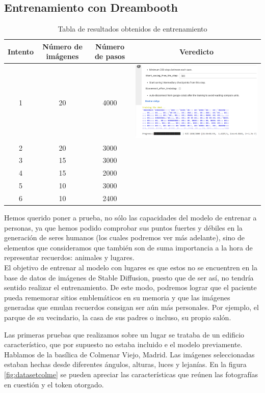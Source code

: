 \subsection{Entrenamiento con Dreambooth}
\begin{table}
	\centering
	\begin{tabular}{c|c|c|c}
		\textbf{Intento} & \textbf{Número de imágenes} & \textbf{Número de pasos} & \textbf{Veredicto} \\
		\hline\hline
		1 & 20 & 4000 & \includegraphics[width = 0.3
			\textwidth]{Imagenes/Vectorial/dreambooth.png}\\
		2 & 20 & 3000 & \\
		3 & 15 & 3000 & \\
		4 & 15 & 2000 & \\
		5 & 10 & 3000 & \\
		6 & 10 & 2400 & \\
		\hline
	\end{tabular}
	\caption{Tabla de resultados obtenidos de entrenamiento}
	\label{tab:resultadosentrenamiento}
\end{table}


Hemos querido poner a prueba, no sólo las capacidades del modelo de entrenar a personas, ya que hemos podido comprobar sus puntos fuertes y débiles en la generación de seres humanos (los cuales podremos ver más adelante), sino de elementos que consideramos que también son de suma importancia a la hora de representar recuerdos: animales y lugares. \\

El objetivo de entrenar al modelo con lugares es que estos no se encuentren en la base de datos de imágenes de Stable Diffusion, puesto que de ser así, no tendría sentido realizar el entrenamiento. De este modo, podremos lograr que el paciente pueda rememorar sitios emblemáticos en su memoria y que las imágenes generadas que emulan recuerdos consigan ser aún más personales. Por ejemplo, el parque de su vecindario, la casa de sus padres o incluso, su propio salón. 

Las primeras pruebas que realizamos sobre un lugar se trataba de un edificio característico, que por supuesto no estaba incluido e el modelo previamente. Hablamos de la basílica de Colmenar Viejo, Madrid. Las imágenes seleccionadas estaban hechas desde diferentes ángulos, alturas, luces y lejanías. En la figura \ref{fig:datasetcolme} se pueden apreciar las características que reúnen las fotografías en cuestión y el token otorgado.

